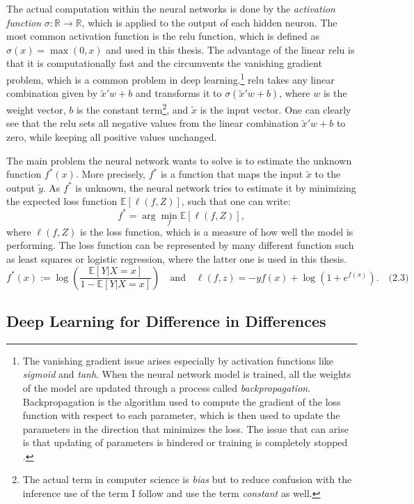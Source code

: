 The actual computation within the neural networks is done by the \textit{activation function} $ \sigma : \mathbb{R} \to \mathbb{R} $, which is applied to the output of each hidden neuron.
The most common activation function is the \ac{relu} function, which is defined as $ \sigma(x) = \max(0, x) $ and used in this thesis.
The advantage of the linear \ac{relu} is that it is computationally fast and the circumvents the vanishing gradient problem, which is a common problem in deep learning.\footnote[1]{The vanishing gradient issue arises especially by activation functions like \textit{sigmoid} and \textit{tanh}.
When the neural network model is trained, all the weights of the model are updated through a process called \textit{backpropagation}.
Backpropagation is the algorithm used to compute the gradient of the loss function with respect to each parameter, which is then used to update the parameters in the direction that minimizes the loss.
The issue that can arise is that updating of parameters is hindered or training is completely stopped \citep{abuqaddom2021oriented}.}
\ac{relu} takes any linear combination given by $\tilde{x}' w + b$ and transforms it to $ \sigma(\tilde{x}' w + b)$, where $w$ is the weight vector, $b$ is the constant term\footnote[2]{The actual term in computer science is \textit{bias} but to reduce confusion with the inference use of the term I follow \citet{farrellDeepNeuralNetworks2021} and use the term \textit{constant} as well.}, and $\tilde{x}$ is the input vector.
One can clearly see that the \ac{relu} sets all negative values from the linear combination $\tilde{x}' w + b$ to zero, while keeping all positive values unchanged.

The main problem the neural network wants to solve is to estimate the unknown function $f^*(x)$.
More precisely, $f^*$ is a function that maps the input $\tilde{x}$ to the output $\tilde{y}$.
As $f^*$ is unknown, the neural network tries to estimate it by minimizing the expected loss function $\mathbb{E}[\ell(f, Z)]$, such that one can write:
\begin{equation}
f^* = \arg \min_f \mathbb{E}[\ell(f, Z)],
\end{equation}
where $\ell(f, Z)$ is the loss function, which is a measure of how well the model is performing. %
The loss function can be represented by many different function such as least squares or logistic regression, where the latter one is used in this thesis.
\begin{equation}
f^*(x) := \log \left( \frac{\mathbb{E}[Y|X = x]}{1 - \mathbb{E}[Y|X = x]} \right) \quad \text{and} \quad \ell(f, z) = -yf(x) + \log(1 + e^{f(x)}). \quad \text{(2.3)}
\end{equation}

\subsection{Deep Learning for Difference in Differences}
